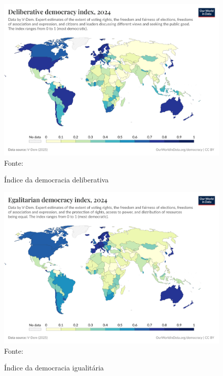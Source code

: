 \begin{figure}[ht]
    \centering
    \caption{Índice da democracia deliberativa}
    \includegraphics[width=1\linewidth]{figuras/democracia/deliberative-democracy-index-vdem.png}
    \label{fig:deliberative-democracy-index-vdem}
    \footnotesize{Fonte: \cite{deliberative_democracy_index_vdem}}
\end{figure}

\begin{figure}[ht]
    \centering
    \caption{Índice da democracia igualitária}
    \includegraphics[width=1\linewidth]{figuras/democracia/egalitarian-democracy-index-vdem.png}
    \label{fig:egalitarian-democracy-index-vdem}
    \footnotesize{Fonte: \cite{egalitarian_democracy_index_vdem}}
\end{figure}

